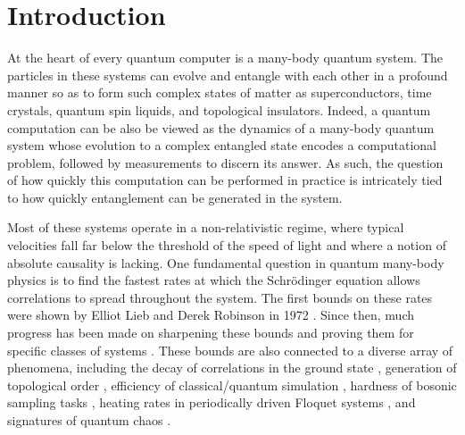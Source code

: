 \chapter{Introduction}


At the heart of every quantum computer is a many-body quantum system.
The particles in these systems can evolve and entangle with each other in a profound manner so as to form such complex states of matter as superconductors, time crystals, quantum spin liquids, and topological insulators.
Indeed, a quantum computation can be also be viewed as the dynamics of a many-body quantum system whose evolution to a complex entangled state encodes a computational problem, followed by measurements to discern its answer.
As such, the question of how quickly this computation can be performed in practice is intricately tied to how quickly entanglement can be generated in the system.

Most of these systems operate in a non-relativistic regime, where typical velocities fall far below the threshold of the speed of light and where a notion of absolute causality is lacking.
One fundamental question in quantum many-body physics is to find the fastest rates at which the Schr\"odinger equation allows correlations to spread throughout the system.
The first bounds on these rates were shown by Elliot Lieb and Derek Robinson in 1972 \cite{LR}.
Since then, much progress has been made on sharpening these bounds \cite{ChenLucas2021graphtheory,WangHazzard2020} and proving them for specific classes of systems \cite{Tran2019a,Chen2019,kuwaharaStrictlyLinearLight2020,Tran2021b}.
These bounds are also connected to a diverse array of phenomena, including the decay of correlations in the ground state \cite{Hastings2006}, generation of topological order \cite{Bravyi2006, Bravyi2010}, efficiency of classical/quantum simulation \cite{Osborne2006,Tran2019a}, hardness of bosonic sampling tasks \cite{Deshpande2018}, heating rates in periodically driven Floquet systems \cite{Abanin2015,Tran2019b}, and signatures of quantum chaos \cite{Lashkari2013,Guo2019}.





